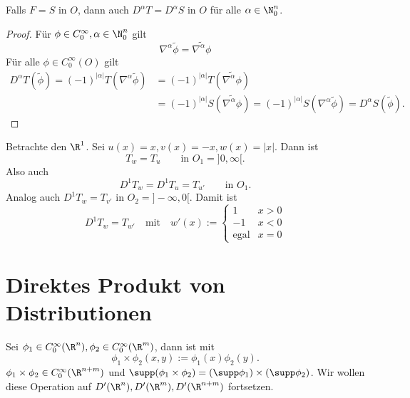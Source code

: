 \begin{nt} \label{5.30}
	Falls $F = S$ in $O$, dann auch $D^\alpha T = D^\alpha S$ in $O$ für alle $\alpha \in \N_0^n$.
	\begin{proof}
		Für $\phi \in C_0^\infty, \alpha \in \N_0^n$ gilt
		\[
			\nabla^\alpha \tilde \phi
			= \widetilde{\nabla^\alpha \phi}
		\]
		Für alle $\phi \in C_0^\infty(O)$ gilt
		\begin{align*}
			D^\alpha T(\tilde \phi)
			= (-1)^{|\alpha|} T(\nabla^{\alpha} \tilde \phi)
			&= (-1)^{|\alpha|} T( \widetilde{\nabla^{\alpha} \phi} ) \\
			&= (-1)^{|\alpha|} S( \widetilde{\nabla^{\alpha} \phi} )
			= (-1)^{|\alpha|} S(\nabla^{\alpha} \tilde \phi)
			= D^\alpha S(\tilde \phi).
		\end{align*}
	\end{proof}
\end{nt}

\begin{ex} \label{5.31}
	Betrachte den $\R^1$.
	Sei $u(x) = x, v(x) = -x, w(x) = |x|$.
	Dann ist
	\[
		T_w = T_u
		\qquad \text{in $O_1 = ]0,\infty[$.}
	\]
	Also auch
	\[
		D^1 T_w = D^1 T_u = T_{u'}
		\qquad \text{in $O_1$.}
	\]
	Analog auch $D^1 T_w = T_{v'}$ in $O_2 = ]-\infty, 0[$.
	Damit ist
	\[
		D^1 T_w
		= T_{w'}
		\quad \text{mit} \quad
		w'(x) :=
		\begin{cases}
			1 & x > 0 \\
			-1 & x < 0 \\
			\text{egal} & x =0
		\end{cases}
	\]
\end{ex}


\section{Direktes Produkt von Distributionen}


\begin{nt} \label{5.32}
	Sei $\phi_1 \in C_0^\infty(\R^n), \phi_2 \in C_0^\infty(\R^m)$, dann ist mit
	\[
		\phi_1 \times \phi_2 (x,y)
		:= \phi_1(x) \phi_2(y).
	\]
	$\phi_1 \times \phi_2 \in C_0^\infty(\R^{n+m})$ und $\supp(\phi_1 \times \phi_2) = (\supp \phi_1) \times (\supp \phi_2)$.
	Wir wollen diese Operation auf $D'(\R^n), D'(\R^m), D'(\R^{n+m})$ fortsetzen.
\end{nt}

